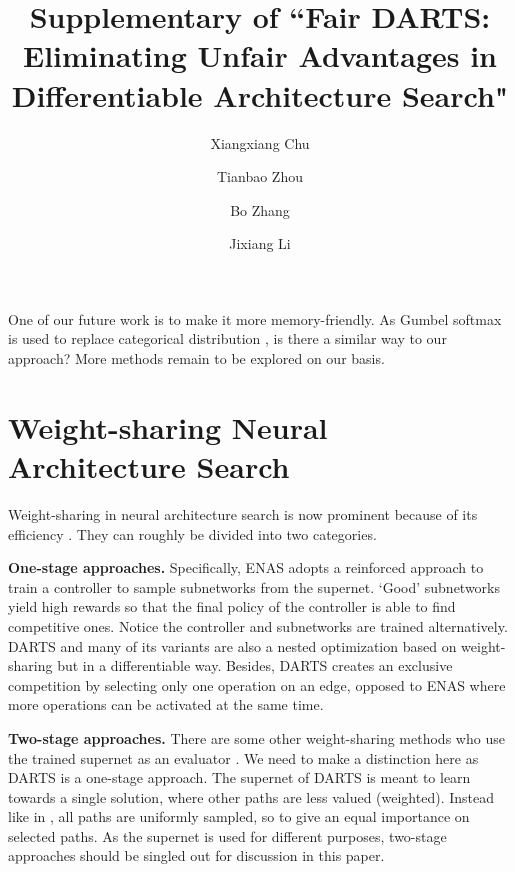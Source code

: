 \documentclass[runningheads]{llncs}
\begin{document}
One of our future work is to make it more memory-friendly. As Gumbel softmax is used to replace categorical distribution \cite{wu2018fbnet}, is there a similar way to our approach? More methods remain to be explored on our basis.


\clearpage
\title{Supplementary of  ``Fair DARTS: Eliminating Unfair Advantages in Differentiable Architecture Search"}



\author{Xiangxiang Chu  \and
	Tianbao Zhou  \and
	Bo Zhang  \and
	Jixiang Li}

\maketitle
\section{Weight-sharing Neural Architecture Search}

Weight-sharing in neural architecture search is now prominent because of its efficiency \cite{brock2017smash,pham2018efficient,bender2018understanding,guo2019single}. They can roughly be divided into two categories.

\textbf{One-stage approaches.}
Specifically, ENAS \cite{pham2018efficient} adopts a reinforced approach to train a controller to sample subnetworks from the supernet. `Good' subnetworks yield high rewards so that the final policy of the controller is able to find competitive ones. Notice the controller and subnetworks are trained alternatively. DARTS \cite{liu2018darts} and many of its variants \cite{wu2018fbnet,xie2018snas,dong2019searching,chen2019progressive} are also a nested optimization based on weight-sharing but in a differentiable way. Besides, DARTS creates an exclusive competition by selecting only one operation on an edge, opposed to ENAS where more operations can be activated at the same time.

\textbf{Two-stage approaches.}
There are some other weight-sharing methods who use the trained supernet as an evaluator \cite{brock2017smash,bender2018understanding,guo2019single}. We need to make a distinction here as DARTS is a one-stage approach. The supernet of DARTS is meant to learn towards a single solution, where other paths are less valued (weighted). Instead like in \cite{guo2019single}, all paths are uniformly sampled, so to give an equal importance on selected paths. As the supernet is used for different purposes, two-stage approaches should be singled out for discussion in this paper. 
\end{document}
